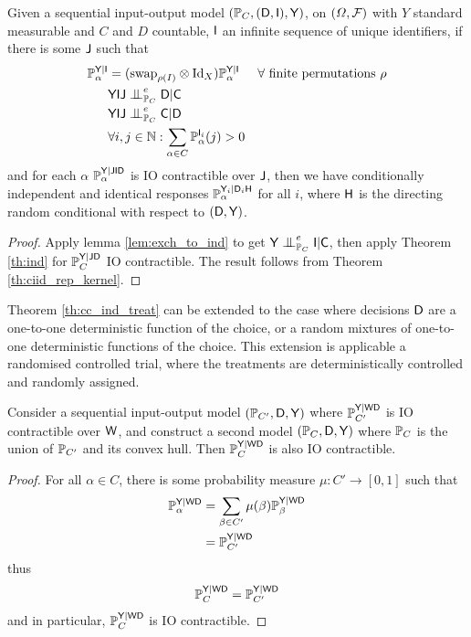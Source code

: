 \begin{theorem}\label{th:cc_ind_treat}
Given a sequential input-output model $(\mathbb{P}_C,(\mathsf{D},\mathsf{I}),\mathsf{Y})$, on $(\Omega,\mathcal{F})$ with $Y$ standard measurable and $C$ and $D$ countable, $\mathsf{I}$ an infinite sequence of unique identifiers, if there is some $\mathsf{J}$ such that
\begin{align}
    \prob{P}_\alpha^{\RV{Y}|\RV{I}} &= (\text{swap}_{\rho(I)}\otimes \text{Id}_X )\prob{P}_\alpha^{\RV{Y}|\RV{I}}&\forall \text{ finite permutations }\rho\\
    &\RV{YIJ}\CI^e_{\prob{P}_C} \RV{D}|\RV{C}\\
    &\RV{YIJ}\CI^e_{\prob{P}_C} \RV{C}|\RV{D}\\
    &\forall i,j\in \mathbb{N}: \sum_{\alpha\in C} \prob{P}_\alpha^{\RV{I}_i}(j)>0
\end{align}
and for each $\alpha$ $\mathbb{P}_\alpha^{\mathsf{Y}|\mathsf{JID}}$ is IO contractible over $\mathsf{J}$, then we have conditionally independent and identical responses $\mathbb{P}_\alpha^{\mathsf{Y}_i|\mathsf{D}_i\mathsf{H}}$ for all $i$, where $\mathsf{H}$ is the directing random conditional with respect to $(\mathsf{D},\mathsf{Y})$.
\end{theorem}

\begin{proof}
Apply lemma \ref{lem:exch_to_ind} to get $\RV{Y}\CI^e_{\prob{P}_C} \RV{I} | \RV{C}$, then apply Theorem \ref{th:ind} for $\mathbb{P}_C^{\mathsf{Y}|\mathsf{J}\mathsf{D}}$ IO contractible. The result follows from Theorem \ref{th:ciid_rep_kernel}.
\end{proof}

Theorem \ref{th:cc_ind_treat} can be extended to the case where decisions $\mathsf{D}$ are a one-to-one deterministic function of the choice, or a random mixtures of one-to-one deterministic functions of the choice. This extension is applicable a randomised controlled trial, where the treatments are deterministically controlled and randomly assigned.

\begin{theorem}\label{cor:extend_to_randomised}
Consider a sequential input-output model $(\mathbb{P}_{C'},\mathsf{D},\mathsf{Y})$ where $\mathbb{P}_{C'}^{\mathsf{Y}|\mathsf{WD}}$ is IO contractible over $\mathsf{W}$, and construct a second model $(\mathbb{P}_{C},\mathsf{D},\mathsf{Y})$ where $\mathbb{P}_C$ is the union of $\mathbb{P}_{C'}$ and its convex hull. Then $\mathbb{P}_{C}^{\mathsf{Y}|\mathsf{WD}}$ is also IO contractible.
\end{theorem}

\begin{proof}
For all $\alpha\in C$, there is some probability measure $\mu:C'\to [0,1]$ such that
\begin{align}
    \mathbb{P}_\alpha^{\mathsf{Y}|\mathsf{WD}} &= \sum_{\beta\in C'} \mu(\beta) \mathbb{P}_\beta^{\mathsf{Y}|\mathsf{WD}}\\
    &= \mathbb{P}_{C'}^{\mathsf{Y}|\mathsf{WD}}
\end{align}
thus
\begin{align}
    \mathbb{P}_C^{\mathsf{Y}|\mathsf{WD}} = \mathbb{P}_{C'}^{\mathsf{Y}|\mathsf{WD}}
\end{align}
and in particular, $\mathbb{P}_C^{\mathsf{Y}|\mathsf{WD}}$ is IO contractible.
\end{proof}

